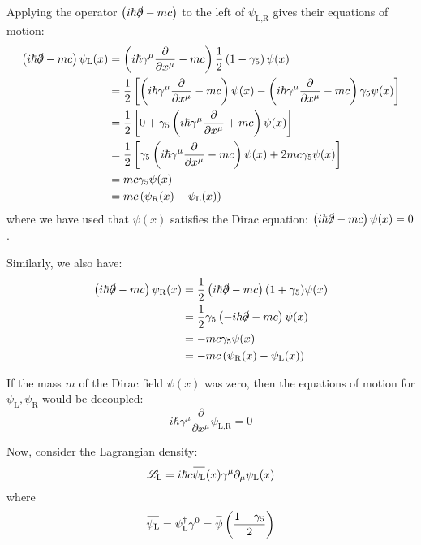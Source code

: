 \documentclass[letterpaper,12pt]{article}
\newenvironment{problem}{\subsection{}\begin{adjustwidth}{0.25in}{}\vspace{-\baselineskip}}{\end{adjustwidth}}
\newcommand{\pder}[2]{\frac{\partial #1}{\partial #2}}
\newcommand{\lagr}{\mathscr{L}}
\newcommand{\overbar}[1]{
	\mkern 1.5mu \overline{\mkern-1.5mu\raisebox{0pt}[\dimexpr\height+0.5mm\relax]{$#1$}\mkern-1.5mu}\mkern 1.5mu
}
\begin{document}
\begin{problem}
Applying the operator $\left(i\hbar\slashed{\partial}-mc\right)$ to the left of $\psi_{\text{L},\text{R}}$ gives their equations of motion:
\begin{align*}
	\left(i\hbar\slashed{\partial}-mc\right)\psi_\text{L}(x)
	&= \left(i\hbar\gamma^\mu\pder{}{x^\mu}-mc\right) \frac{1}{2}\left(1-\gamma_5\right)\psi(x)	\\
	&= \frac{1}{2} \left[\left(i\hbar\gamma^\mu\pder{}{x^\mu}-mc\right)\psi(x)
	- \left(i\hbar\gamma^\mu\pder{}{x^\mu}-mc\right)\gamma_5\psi(x)\right]	\\
	&= \frac{1}{2} \left[0 + \gamma_5 \left(i\hbar\gamma^\mu\pder{}{x^\mu} + mc\right)\psi(x)\right]	\\
	&= \frac{1}{2} \left[\gamma_5\left(i\hbar\gamma^\mu\pder{}{x^\mu}-mc\right)\psi(x) + 2mc\gamma_5 \psi(x)\right]	\\
	&= mc\gamma_5\psi(x)	\\
	&= mc\left(\psi_\text{R}(x) - \psi_\text{L}(x)\right)
\end{align*}
where we have used that $\psi(x)$ satisfies the Dirac equation: $\left(i\hbar\slashed{\partial}-mc\right)\psi(x)=0$.

Similarly, we also have:
\begin{align*}
	\left(i\hbar\slashed{\partial} - mc\right) \psi_\text{R}(x)
	&= \frac{1}{2}\left(i\hbar\slashed{\partial} - mc\right)(1+\gamma_5) \psi(x)	\\
	&= \frac{1}{2}\gamma_5\left(-i\hbar\slashed{\partial}-mc\right)\psi(x)	\\
	&= -mc\gamma_5\psi(x)	\\
	&= -mc\left(\psi_\text{R}(x) - \psi_\text{L}(x)\right)
\end{align*}

If the mass $m$ of the Dirac field $\psi(x)$ was zero, then the equations of motion for $\psi_\text{L}, \psi_\text{R}$ would be decoupled:
\begin{equation*}
	i\hbar\gamma^\mu\pder{}{x^\mu}\psi_{\text{L},\text{R}} = 0
\end{equation*}

Now, consider the Lagrangian density:
\begin{equation*}
	\lagr_\text{L} = i\hbar c \overbar{\psi_\text{L}}(x) \gamma^\mu \partial_\mu \psi_\text{L}(x)
\end{equation*}
where
\begin{equation*}
	\overbar{\psi_\text{L}} =\psi_\text{L}^\dagger \gamma^0 = \overbar{\psi} \left(\frac{1+\gamma_5}{2}\right)
\end{equation*}


\end{problem}
\end{document}
